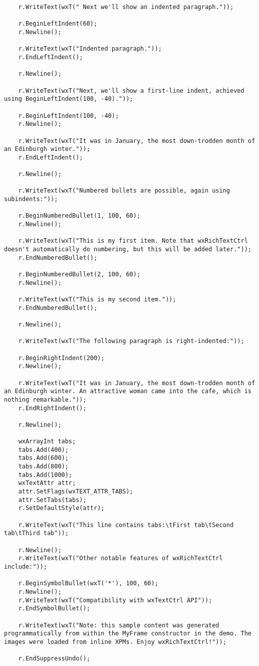 {\begin{verbatim}
    r.WriteText(wxT(" Next we'll show an indented paragraph."));

    r.BeginLeftIndent(60);
    r.Newline();

    r.WriteText(wxT("Indented paragraph."));
    r.EndLeftIndent();

    r.Newline();

    r.WriteText(wxT("Next, we'll show a first-line indent, achieved using BeginLeftIndent(100, -40)."));

    r.BeginLeftIndent(100, -40);
    r.Newline();

    r.WriteText(wxT("It was in January, the most down-trodden month of an Edinburgh winter."));
    r.EndLeftIndent();

    r.Newline();

    r.WriteText(wxT("Numbered bullets are possible, again using subindents:"));

    r.BeginNumberedBullet(1, 100, 60);
    r.Newline();

    r.WriteText(wxT("This is my first item. Note that wxRichTextCtrl doesn't automatically do numbering, but this will be added later."));
    r.EndNumberedBullet();

    r.BeginNumberedBullet(2, 100, 60);
    r.Newline();

    r.WriteText(wxT("This is my second item."));
    r.EndNumberedBullet();

    r.Newline();

    r.WriteText(wxT("The following paragraph is right-indented:"));

    r.BeginRightIndent(200);
    r.Newline();

    r.WriteText(wxT("It was in January, the most down-trodden month of an Edinburgh winter. An attractive woman came into the cafe, which is nothing remarkable."));
    r.EndRightIndent();

    r.Newline();

    wxArrayInt tabs;
    tabs.Add(400);
    tabs.Add(600);
    tabs.Add(800);
    tabs.Add(1000);
    wxTextAttr attr;
    attr.SetFlags(wxTEXT_ATTR_TABS);
    attr.SetTabs(tabs);
    r.SetDefaultStyle(attr);
    
    r.WriteText(wxT("This line contains tabs:\tFirst tab\tSecond tab\tThird tab"));

    r.Newline();
    r.WriteText(wxT("Other notable features of wxRichTextCtrl include:"));

    r.BeginSymbolBullet(wxT('*'), 100, 60);
    r.Newline();
    r.WriteText(wxT("Compatibility with wxTextCtrl API"));
    r.EndSymbolBullet();

    r.WriteText(wxT("Note: this sample content was generated programmatically from within the MyFrame constructor in the demo. The images were loaded from inline XPMs. Enjoy wxRichTextCtrl!"));

    r.EndSuppressUndo();
\end{verbatim}
}

